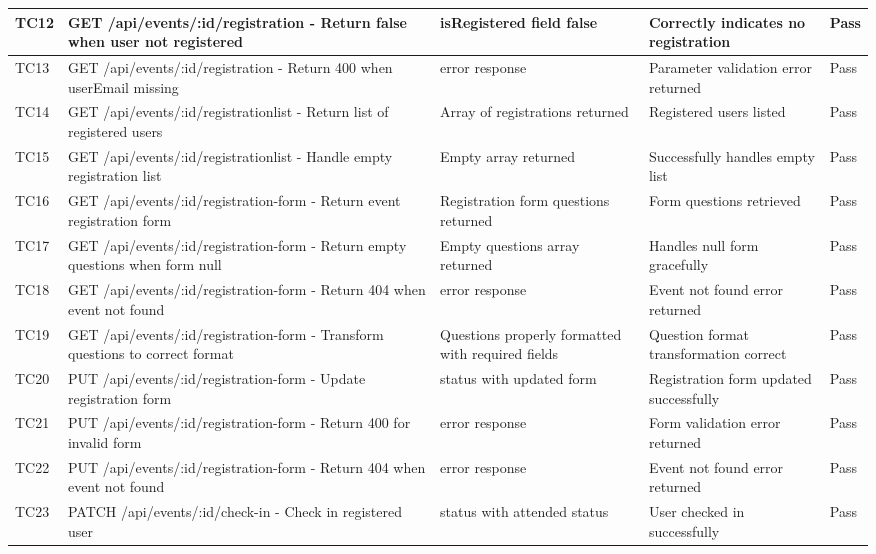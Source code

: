 \documentclass[12pt, titlepage]{article}
\begin{document}
\begin{longtable}{|>{\raggedright\arraybackslash}p{1cm}|>{\raggedright\arraybackslash}p{5cm}|>{\raggedright\arraybackslash}p{3.25cm}|>{\raggedright\arraybackslash}p{3.25cm}|>{\raggedright\arraybackslash}p{1.5cm}|}
\hline
TC12 & GET /api/events/:id/registration - Return false when user not registered & isRegistered field false & Correctly indicates no registration & \cellcolor{green!30}Pass \\
\hline
TC13 & GET /api/events/:id/registration - Return 400 when userEmail missing & 400 error response & Parameter validation error returned & \cellcolor{green!30}Pass \\
\hline
TC14 & GET /api/events/:id/registrationlist - Return list of registered users & Array of registrations returned & Registered users listed & \cellcolor{green!30}Pass \\
\hline
TC15 & GET /api/events/:id/registrationlist - Handle empty registration list & Empty array returned & Successfully handles empty list & \cellcolor{green!30}Pass \\
\hline
TC16 & GET /api/events/:id/registration-form - Return event registration form & Registration form questions returned & Form questions retrieved & \cellcolor{green!30}Pass \\
\hline
TC17 & GET /api/events/:id/registration-form - Return empty questions when form null & Empty questions array returned & Handles null form gracefully & \cellcolor{green!30}Pass \\
\hline
TC18 & GET /api/events/:id/registration-form - Return 404 when event not found & 404 error response & Event not found error returned & \cellcolor{green!30}Pass \\
\hline
TC19 & GET /api/events/:id/registration-form - Transform questions to correct format & Questions properly formatted with required fields & Question format transformation correct & \cellcolor{green!30}Pass \\
\hline
TC20 & PUT /api/events/:id/registration-form - Update registration form & 200 status with updated form & Registration form updated successfully & \cellcolor{green!30}Pass \\
\hline
TC21 & PUT /api/events/:id/registration-form - Return 400 for invalid form & 400 error response & Form validation error returned & \cellcolor{green!30}Pass \\
\hline
TC22 & PUT /api/events/:id/registration-form - Return 404 when event not found & 404 error response & Event not found error returned & \cellcolor{green!30}Pass \\
\hline
TC23 & PATCH /api/events/:id/check-in - Check in registered user & 200 status with attended status & User checked in successfully & \cellcolor{green!30}Pass \\

\end{longtable}
\end{document}
